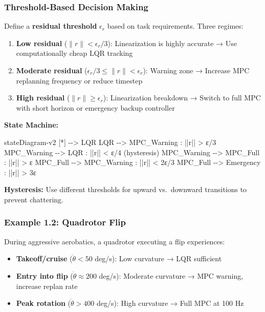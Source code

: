 \documentclass[
  letterpaper,
  DIV=11,
  numbers=noendperiod]{scrartcl}
\newenvironment{Shaded}{\begin{snugshade}}{\end{snugshade}}
\newcommand{\NormalTok}[1]{\textcolor[rgb]{0.00,0.23,0.31}{#1}}
\providecommand{\tightlist}{%
  \setlength{\itemsep}{0pt}\setlength{\parskip}{0pt}}\usepackage{longtable,booktabs,array}
\begin{document}
\subsubsection{Threshold-Based Decision
Making}\label{threshold-based-decision-making}

Define a \textbf{residual threshold} \(\epsilon_r\) based on task
requirements. Three regimes:

\begin{enumerate}
\def\labelenumi{\arabic{enumi}.}
\item
  \textbf{Low residual} (\(\|r\| < \epsilon_r / 3\)): Linearization is
  highly accurate → Use computationally cheap LQR tracking
\item
  \textbf{Moderate residual}
  (\(\epsilon_r / 3 \leq \|r\| < \epsilon_r\)): Warning zone → Increase
  MPC replanning frequency or reduce timestep
\item
  \textbf{High residual} (\(\|r\| \geq \epsilon_r\)): Linearization
  breakdown → Switch to full MPC with short horizon or emergency backup
  controller
\end{enumerate}

\textbf{State Machine:}

\begin{Shaded}
\begin{Highlighting}[]
\NormalTok{stateDiagram{-}v2}
\NormalTok{    [*] {-}{-}\textgreater{} LQR}
\NormalTok{    LQR {-}{-}\textgreater{} MPC\_Warning : ||r|| \textgreater{} ε/3}
\NormalTok{    MPC\_Warning {-}{-}\textgreater{} LQR : ||r|| \textless{} ε/4 (hysteresis)}
\NormalTok{    MPC\_Warning {-}{-}\textgreater{} MPC\_Full : ||r|| \textgreater{} ε}
\NormalTok{    MPC\_Full {-}{-}\textgreater{} MPC\_Warning : ||r|| \textless{} 2ε/3}
\NormalTok{    MPC\_Full {-}{-}\textgreater{} Emergency : ||r|| \textgreater{} 3ε}
\end{Highlighting}
\end{Shaded}

\textbf{Hysteresis:} Use different thresholds for upward vs.~downward
transitions to prevent chattering.

\subsubsection{Example 1.2: Quadrotor
Flip}\label{example-1.2-quadrotor-flip}

During aggressive aerobatics, a quadrotor executing a flip experiences:

\begin{itemize}
\tightlist
\item
  \textbf{Takeoff/cruise} (\(\dot{\theta} < 50\) deg/s): Low curvature →
  LQR sufficient
\item
  \textbf{Entry into flip} (\(\dot{\theta} \approx 200\) deg/s):
  Moderate curvature → MPC warning, increase replan rate
\item
  \textbf{Peak rotation} (\(\dot{\theta} > 400\) deg/s): High curvature
  → Full MPC at 100 Hz
\end{itemize}
\end{document}
